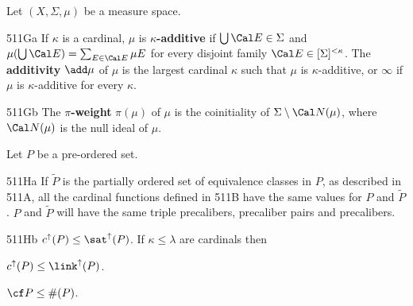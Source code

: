  Let $(X,\Sigma,\mu)$ be a measure space.

\spheader 511Ga If $\kappa$ is a cardinal,
$\mu$ is {\bf $\kappa$-additive} if
$\bigcup\Cal E\in\Sigma$ and $\mu(\bigcup\Cal E)=\sum_{E\in\Cal E}\mu E$
for every disjoint family $\Cal E\in[\Sigma]^{<\kappa}$.   The {\bf
additivity} $\add\mu$ of $\mu$ is the largest cardinal $\kappa$ such
that $\mu$ is
$\kappa$-additive, or $\infty$ if $\mu$ is $\kappa$-additive for every
$\kappa$.

\spheader 511Gb The {\bf $\pi$-weight} $\pi(\mu)$ of $\mu$
is the coinitiality of $\Sigma\setminus\Cal N(\mu)$, where
$\Cal N(\mu)$ is the null ideal of $\mu$.


 Let $P$ be a
pre-ordered set.

\spheader 511Ha If $\tilde P$ is the partially ordered set of equivalence
classes in $P$, as described in 511A, all the cardinal functions defined in
511B have the same values for $P$ and
$\tilde P$.    
$P$ and $\tilde P$ will have the same triple
precalibers, precaliber pairs and precalibers.

\spheader 511Hb $c^{\uparrow}(P)\le\sat^{\uparrow}(P)$.      If $\kappa\le\lambda$ are cardinals then


\noindent{}$c^{\uparrow}(P)\le\link^{\uparrow}(P)$.   


\noindent{}$\cf P\le\#(P)$.   

